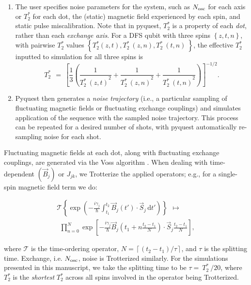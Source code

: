 \documentclass[aps,prl,twocolumn,superscriptaddress,nobibnotes,10pt,floatfix]{revtex4-2}
\newcommand{\ts}[2]{{#1}_{\textnormal{#2}}}
\begin{document}
\begin{enumerate}
\item
The user specifies noise parameters for the system, such as \(\ts{N}{osc}\) for each axis or \(T_{2}^{*}\) for each dot, the (static) magnetic field experienced by each spin, and static pulse miscalibration.  Note that in
pyquest, \(T_{2}^{*}\) is a property of each \emph{dot}, rather than each \emph{exchange axis}.
For a DFS qubit with three spins
\(\left\{ z,t,n \right\}\), with pairwise \(T_{2}^{*}\) values
\(\left\{ T_{2}^{*}(z,t),T_{2}^{*}\ (z,n),T_{2}^{*}\ (t,n)\  \right\}\),
the effective \(T_{2}^{*}\) inputted to simulation for all three spins is
\[T_{2}^{*}\ \  = \ \left\lbrack \frac{1}{3}\left( \frac{1}{{T_{2}^{*}\ (z,t)}^{2}} + \frac{1}{{T_{2}^{*}\ (z,n)}^{2}} + \frac{1}{{T_{2}^{*}\ (t,n)}^{2}} \right) \right\rbrack^{- 1/2}.\]
\item
Pyquest then generates a \emph{noise trajectory} (i.e., a particular sampling of fluctuating magnetic fields or fluctuating exchange couplings) and simulates application of the sequence with the sampled noise trajectory.
This process can be repeated for a desired number of shots, with pyquest automatically re-sampling noise for each shot.
\end{enumerate}

Fluctuating magnetic fields at each dot, along with fluctuating exchange couplings, are generated via the Voss algorithm \cite{s_voss_efficient_2022}.
When dealing with time-dependent $({\vec{B}}_{j})$ or \(J_{jk}\), we Trotterize the applied operators; e.g., for a single-spin magnetic field term we do:

\begin{equation}\begin{split}
\mathcal{T}\left\{ \exp\left( - \frac{i\gamma_{j}}{\hslash}\int_{t_{1}}^{t_{2}}{{\vec{B}}_{j}\left( t' \right)} \cdot {\vec{S}}_{j}\,\text{d}t' \right) \right\}\ \  \mapsto \\ \ \ \prod_{n = 0}^{N}{\exp\left\lbrack - \frac{i\gamma_{j}}{\hslash}{\vec{B}}_{j}\left( t_{1} + n\frac{t_{2} - t_{1}}{N} \right) \cdot {\vec{S}}_{j}\frac{t_{2} - t_{1}}{N} \right\rbrack},
\end{split}\end{equation}

where \(\mathcal{T}\) is the time-ordering operator, \(N = \left\lceil \left( t_{2} - t_{1} \right)\text{/}\tau \right\rceil\), and \(\tau\) is the splitting time.
Exchange, i.e. \(\ts{N}{osc}\), noise is Trotterized similarly.
For the simulations presented in this manuscript, we take the splitting time to be \(\tau = \ T_{2}^{*}\ \text{/}20\), where \(T_{2}^{*}\) is the \emph{shortest} \(T_{2}^{*}\) across all spins involved in the operator being Trotterized.
\end{document}
